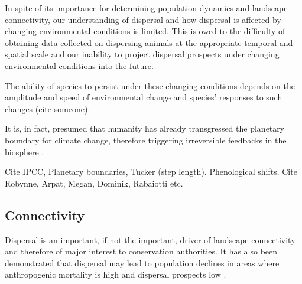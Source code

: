 \documentclass[abstract=on,10pt,a4paper,bibliography=totocnumbered]{article}
\begin{document}
In spite of its importance for determining population dynamics and landscape
connectivity, our understanding of dispersal and how dispersal is affected by
changing environmental conditions is limited. This is owed to the difficulty of
obtaining data collected on dispersing animals at the appropriate temporal and
spatial scale \citep{Graves.2014, Vasudev.2015} and our inability to project
dispersal prospects under changing environmental conditions into the future.

The ability of species
to persist under these changing conditions depends on the amplitude and speed of
environmental change and species' responses to such changes (cite someone).

It is, in fact, presumed that humanity has already transgressed the planetary
boundary for climate change, therefore triggering irreversible feedbacks in the
biosphere \citep{Rockstrom.2009}.

Cite IPCC, Planetary boundaries, Tucker (step length). Phenological shifts. Cite
Robynne, Arpat, Megan, Dominik, Rabaiotti etc.

\subsection{Connectivity}
Dispersal is an important, if not the important, driver of landscape
connectivity and therefore of major interest to conservation authorities. It has
also been demonstrated that dispersal may lead to population declines in areas
where anthropogenic mortality is high and dispersal prospects low
\citep{Leigh.2012}.
\end{document}
